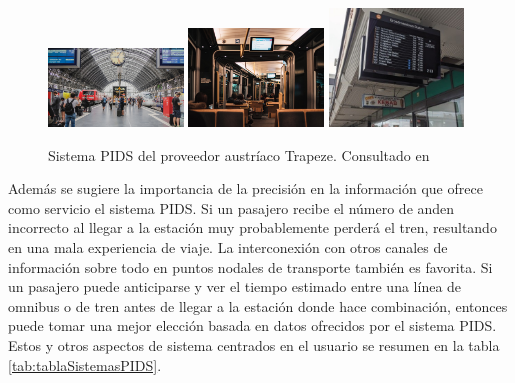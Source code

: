 \begin{figure}[h]
	\centering
	\includegraphics[width=0.32\textwidth]{./Figures/TrapezeStation.jpg}
	\includegraphics[width=0.32\textwidth]{./Figures/TrapezeOnboard.jpg}
	\includegraphics[width=0.32\textwidth]{./Figures/TrapezeTimetable.jpg}
	\caption{Sistema PIDS del proveedor austríaco Trapeze. Consultado en \citep{Trapeze}}
	\label{fig:Trapeze}
\end{figure}

Además se sugiere la importancia de la precisión en la información que ofrece como servicio el sistema PIDS. Si un pasajero recibe el número de anden incorrecto al llegar a la estación muy probablemente perderá el tren, resultando en una mala experiencia de viaje. La interconexión con otros canales de información sobre todo en puntos nodales de transporte también es favorita. Si un pasajero puede anticiparse y ver el tiempo estimado entre una línea de omnibus o de tren antes de llegar a la estación donde hace combinación, entonces puede tomar una mejor elección basada en datos ofrecidos por el sistema PIDS. Estos y otros aspectos de sistema centrados en el usuario se resumen en la tabla \ref{tab:tablaSistemasPIDS}.\\


